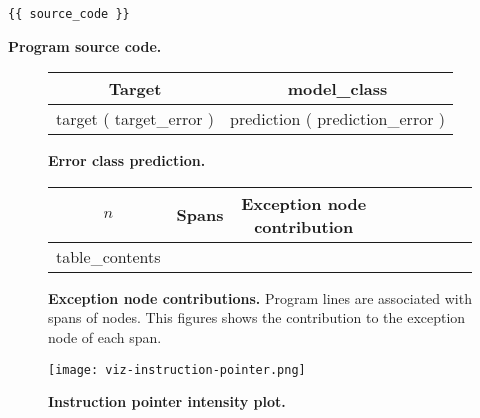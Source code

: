 \documentclass{article}
\begin{document}
\setlength\dashlinedash{.5pt}
\setlength\dashlinegap{6pt}
\setlength\arrayrulewidth{0.3pt}

\begin{verbatim}
{{ source_code }}
\end{verbatim}

\textbf{Program source code.}

\begin{figure}[H]
\centering
\resizebox{\textwidth}{!}
{
\begin{tabular}{c|c}
\toprule
Target & {{ model_class }} \\
\midrule
{{ target }} ({{ target_error }}) & {{ prediction }} ({{ prediction_error }}) \\
\bottomrule
\end{tabular}
}
\caption{
    \textbf{Error class prediction.}
}
\label{fig:program-representations}
\end{figure}

\begin{figure}[H]
\centering
\resizebox{\textwidth}{!}
{
\begin{tabular}{cl|cccc|ccc}
\toprule
$n$ & Spans & Exception node contribution \\
\midrule
{{ table_contents }}
\bottomrule
\end{tabular}
}
\caption{
    \textbf{Exception node contributions.} Program lines are associated with spans of nodes. This figures shows the contribution to the exception node of each span.
}
\label{fig:program-representations}
\end{figure}

\begin{figure}[H]
\texttt{[image: viz-instruction-pointer.png]}
\caption{
    \textbf{Instruction pointer intensity plot.}
}
\end{figure}
\end{document}
